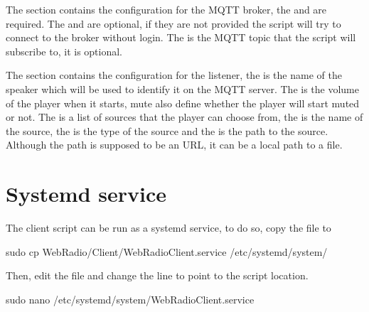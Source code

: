 \documentclass[letterpaper,10pt,english]{sphinxmanual}
\begin{document}
\sphinxAtStartPar
The  section contains the configuration for the MQTT broker, the  and  are required.
The  and  are optional, if they are not provided the script will try to connect to the broker
without login. The  is the MQTT topic that the script will subscribe to, it is optional.

\sphinxAtStartPar
The  section contains the configuration for the listener, the  is the name of the speaker
which will be used to identify it on the MQTT server. The  is the volume of the player when it starts,
mute also define whether the player will start muted or not. The  is a list of sources that the player
can choose from, the  is the name of the source, the  is the type of the source and the 
is the path to the source. Although the path is supposed to be an URL, it can be a local path to a file.


\section{Systemd service}
\label{\detokenize{client_install:systemd-service}}
\sphinxAtStartPar
The client script can be run as a systemd service, to do so, copy the  file to

\begin{sphinxVerbatim}[commandchars=\\\{\}]
sudo cp WebRadio/Client/WebRadioClient.service /etc/systemd/system/
\end{sphinxVerbatim}

\sphinxAtStartPar
Then, edit the file and change the  line to point to the script location.

\begin{sphinxVerbatim}[commandchars=\\\{\}]
sudo nano /etc/systemd/system/WebRadioClient.service
\end{sphinxVerbatim}

\begin{sphinxVerbatim}[commandchars=\\\{\}]


\end{sphinxVerbatim}
\end{document}
